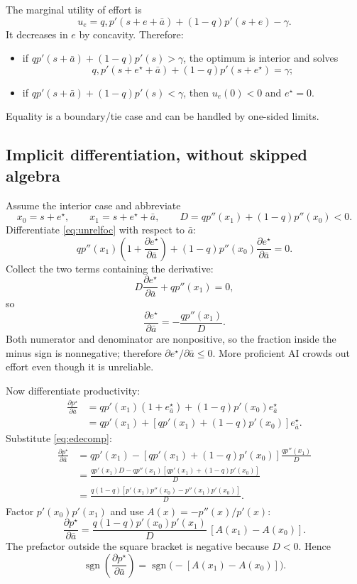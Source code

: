 \documentclass[11pt]{article}
\theoremstyle{tutorial}
\theoremstyle{remark}
\newcommand{\1}{\mathbb{I}}
\newcommand{\sgn}{\operatorname{sgn}}
\begin{document}
The marginal utility of effort is
\[
u_e=q,p'(s+e+\bar a)+(1-q)p'(s+e)-\gamma.
\]
It decreases in $e$ by concavity.  Therefore:
\begin{itemize}
  \item if $q p'(s+\bar a)+(1-q)p'(s)>\gamma$, the optimum is interior and solves
  \begin{equation}
  q,p'(s+e^\star+\bar a)+(1-q)p'(s+e^\star)=\gamma;
  \label{eq:unrelfoc}
  \end{equation}
  \item if $q p'(s+\bar a)+(1-q)p'(s)<\gamma$, then $u_e(0)<0$ and $e^\star=0$.
\end{itemize}
Equality is a boundary/tie case and can be handled by one-sided limits.

\subsection{Implicit differentiation, without skipped algebra}

Assume the interior case and abbreviate
\[
  x_0=s+e^\star,
  \qquad x_1=s+e^\star+\bar a,
  \qquad D=q p''(x_1)+(1-q)p''(x_0)<0.
\]
Differentiate \eqref{eq:unrelfoc} with respect to $\bar a$:
\[
q p''(x_1)\left(1+\frac{\partial e^\star}{\partial\bar a}\right)
+(1-q)p''(x_0)\frac{\partial e^\star}{\partial\bar a}=0.
\]
Collect the two terms containing the derivative:
\[
D\frac{\partial e^\star}{\partial\bar a}+q p''(x_1)=0,
\]
so
\begin{equation}
\boxed{
\frac{\partial e^\star}{\partial\bar a}=-\frac{q p''(x_1)}{D}.}
\label{eq:edecomp}
\end{equation}
Both numerator and denominator are nonpositive, so the fraction inside the minus sign is nonnegative;
therefore $\partial e^\star/\partial\bar a\le0$.  More proficient AI crowds out effort even though it is
unreliable.

Now differentiate productivity:
\begin{align*}
\frac{\partial p^\star}{\partial\bar a}
&=q p'(x_1)\left(1+e^\star_{\bar a}\right)
 +(1-q)p'(x_0)e^\star_{\bar a}\\
&=q p'(x_1)+[q p'(x_1)+(1-q)p'(x_0)]e^\star_{\bar a}.
\end{align*}
Substitute \eqref{eq:edecomp}:
\begin{align*}
\frac{\partial p^\star}{\partial\bar a}
&=q p'(x_1)-[q p'(x_1)+(1-q)p'(x_0)]\frac{q p''(x_1)}{D}\\
&=\frac{q p'(x_1)D-q p''(x_1)[q p'(x_1)+(1-q)p'(x_0)]}{D}\\
&=\frac{q(1-q)[p'(x_1)p''(x_0)-p''(x_1)p'(x_0)]}{D}.
\end{align*}
Factor $p'(x_0)p'(x_1)$ and use $A(x)=-p''(x)/p'(x)$:
\begin{equation}
\boxed{
\frac{\partial p^\star}{\partial\bar a}
=\frac{q(1-q)p'(x_0)p'(x_1)}{D}\,[A(x_1)-A(x_0)].}
\label{eq:araidentity}
\end{equation}
The prefactor outside the square bracket is negative because $D<0$.  Hence
\[
\sgn\left(\frac{\partial p^\star}{\partial\bar a}\right)
=\sgn\bigl(-[A(x_1)-A(x_0)]\bigr).
\]
\end{document}
